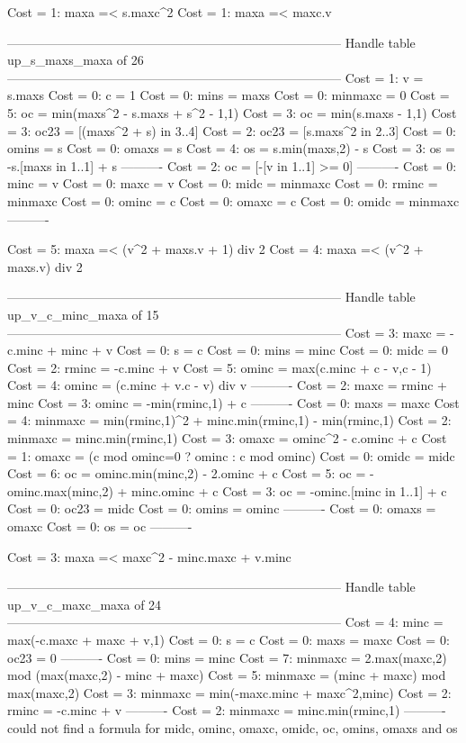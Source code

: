 Cost =  1:  maxa =< s.maxc^2
Cost =  1:  maxa =< maxc.v

--------------------------------------------------------------------------------
Handle table up_s_maxs_maxa of 26
--------------------------------------------------------------------------------
Cost =  1:  v       = s.maxs
Cost =  0:  c       = 1
Cost =  0:  mins    = maxs
Cost =  0:  minmaxc = 0
Cost =  5:  oc      = min(maxs^2 - s.maxs + s^2 - 1,1)
Cost =  3:  oc      = min(s.maxs - 1,1)
Cost =  3:  oc23    = [(maxs^2 + s) in 3..4]
Cost =  2:  oc23    = [s.maxs^2 in 2..3]
Cost =  0:  omins   = s
Cost =  0:  omaxs   = s
Cost =  4:  os      = s.min(maxs,2) - s
Cost =  3:  os      = -s.[maxs in 1..1] + s
----------
Cost =  2:  oc      = [-[v in 1..1] >= 0]
----------
Cost =  0:  minc    = v
Cost =  0:  maxc    = v
Cost =  0:  midc    = minmaxc
Cost =  0:  rminc   = minmaxc
Cost =  0:  ominc   = c
Cost =  0:  omaxc   = c
Cost =  0:  omidc   = minmaxc
----------

Cost =  5:  maxa =< (v^2 + maxs.v + 1) div 2
Cost =  4:  maxa =< (v^2 + maxs.v) div 2

--------------------------------------------------------------------------------
Handle table up_v_c_minc_maxa of 15
--------------------------------------------------------------------------------
Cost =  3:  maxc    = -c.minc + minc + v
Cost =  0:  s       = c
Cost =  0:  mins    = minc
Cost =  0:  midc    = 0
Cost =  2:  rminc   = -c.minc + v
Cost =  5:  ominc   = max(c.minc + c - v,c - 1)
Cost =  4:  ominc   = (c.minc + v.c - v) div v
----------
Cost =  2:  maxc    = rminc + minc
Cost =  3:  ominc   = -min(rminc,1) + c
----------
Cost =  0:  maxs    = maxc
Cost =  4:  minmaxc = min(rminc,1)^2 + minc.min(rminc,1) - min(rminc,1)
Cost =  2:  minmaxc = minc.min(rminc,1)
Cost =  3:  omaxc   = ominc^2 - c.ominc + c
Cost =  1:  omaxc   = (c mod ominc=0 ? ominc : c mod ominc)
Cost =  0:  omidc   = midc
Cost =  6:  oc      = ominc.min(minc,2) - 2.ominc + c
Cost =  5:  oc      = -ominc.max(minc,2) + minc.ominc + c
Cost =  3:  oc      = -ominc.[minc in 1..1] + c
Cost =  0:  oc23    = midc
Cost =  0:  omins   = ominc
----------
Cost =  0:  omaxs   = omaxc
Cost =  0:  os      = oc
----------

Cost =  3:  maxa =< maxc^2 - minc.maxc + v.minc

--------------------------------------------------------------------------------
Handle table up_v_c_maxc_maxa of 24
--------------------------------------------------------------------------------
Cost =  4:  minc    = max(-c.maxc + maxc + v,1)
Cost =  0:  s       = c
Cost =  0:  maxs    = maxc
Cost =  0:  oc23    = 0
----------
Cost =  0:  mins    = minc
Cost =  7:  minmaxc = 2.max(maxc,2) mod (max(maxc,2) - minc + maxc)
Cost =  5:  minmaxc = (minc + maxc) mod max(maxc,2)
Cost =  3:  minmaxc = min(-maxc.minc + maxc^2,minc)
Cost =  2:  rminc   = -c.minc + v
----------
Cost =  2:  minmaxc = minc.min(rminc,1)
----------
could not find a formula for midc, ominc, omaxc, omidc, oc, omins, omaxs and os


